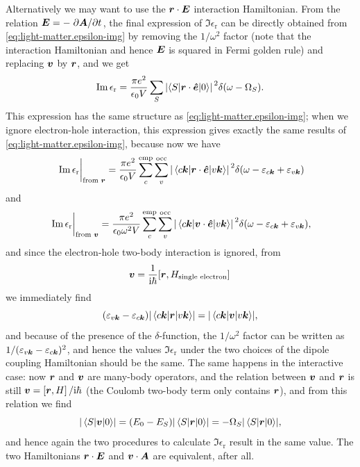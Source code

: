 \documentclass[hyperref, a4paper, 12pt]{report}
\newcommand*{\ii}{\mathrm{i}}
\newcommand*{\epsr}{\epsilon_{\text{r}}}
\begin{document}
Alternatively we may want to use the $\vb*{r} \cdot \vb*{E}$ interaction Hamiltonian.
From the relation $\vb*{E} = - \pdv*{\vb*{A}}{t}$, 
the final expression of $\Im \epsr$ can be directly obtained from \eqref{eq:light-matter.epsilon-img}
by removing the $1 / \omega^2$ factor 
(note that the interaction Hamiltonian and hence $\vb*{E}$ is squared in Fermi golden rule)
and replacing $\vb*{v}$ by $\vb*{r}$, and we get 
\begin{equation}
    \Im \epsr = \frac{\pi e^2}{\epsilon_0 V} 
    \sum_S \abs*{\mel**{S}{\vb*{r} \cdot \vu*{e}}{0}}^2 \delta(\omega - \Omega_S).
\end{equation}
This expression has the same structure as \eqref{eq:light-matter.epsilon-img};
when we ignore electron-hole interaction, 
this expression gives exactly the same results of \eqref{eq:light-matter.epsilon-img},
because now we have 
\begin{equation}
    \eval*{\Im \epsr}_{\text{from $\vb*{r}$}} = \frac{\pi e^2}{\epsilon_0 V} 
    \sum_{c}^{\text{emp}} \sum_{v}^{\text{occ}} \abs*{\mel*{c \vb*{k}}{\vb*{r} \cdot \vu*{e}}{v \vb*{k}}}^2 
    \delta(\omega - \varepsilon_{c \vb*{k}} + \varepsilon_{v \vb*{k}})
\end{equation}
and 
\begin{equation}
    \eval*{\Im \epsr}_{\text{from $\vb*{v}$}} = \frac{\pi e^2}{\epsilon_0 \omega^2 V} 
    \sum_{c}^{\text{emp}} \sum_{v}^{\text{occ}} \abs*{\mel*{c \vb*{k}}{\vb*{v} \cdot \vu*{e}}{v \vb*{k}}}^2 
    \delta(\omega - \varepsilon_{c \vb*{k}} + \varepsilon_{v \vb*{k}}),
\end{equation}
and since the electron-hole two-body interaction is ignored, 
from 
\[
    \vb*{v} = \frac{1}{\ii \hbar} \comm*{\vb*{r}}{H_{\text{single electron}}}
\]
we immediately find 
\[
    (\varepsilon_{v \vb*{k}} - \varepsilon_{c \vb*{k}}) \abs{\mel*{c \vb*{k}}{\vb*{r}}{v \vb*{k}}} =
    \abs{\mel*{c \vb*{k}}{\vb*{v}}{v \vb*{k}}},
\]
and because of the presence of the $\delta$-function, 
the $1/\omega^2$ factor can be written as $1 / (\varepsilon_{v \vb*{k}} - \varepsilon_{c \vb*{k}})^2$,
and hence the values $\Im \epsr$ under the two choices of the dipole coupling Hamiltonian should be the same.
The same happens in the interactive case:
now $\vb*{r}$ and $\vb*{v}$ are many-body operators, 
and the relation between $\vb*{v}$ and $\vb*{r}$ is still 
$\vb*{v} = \comm*{\vb*{r}}{H} / \ii \hbar$ (the Coulomb two-body term only contains $\vb*{r}$), 
and from this relation we find 
\[
    \abs{\mel*{S}{\vb*{v}}{0}} = (E_0 - E_S) \abs{\mel*{S}{\vb*{r}}{0}}
    = - \Omega_S \abs{\mel*{S}{\vb*{r}}{0}},
\] 
and hence again the two procedures to calculate $\Im \epsr$ result in the same value.
The two Hamiltonians $\vb*{r} \cdot \vb*{E}$ and $\vb*{v} \cdot \vb*{A}$
are equivalent, after all.
\end{document}
